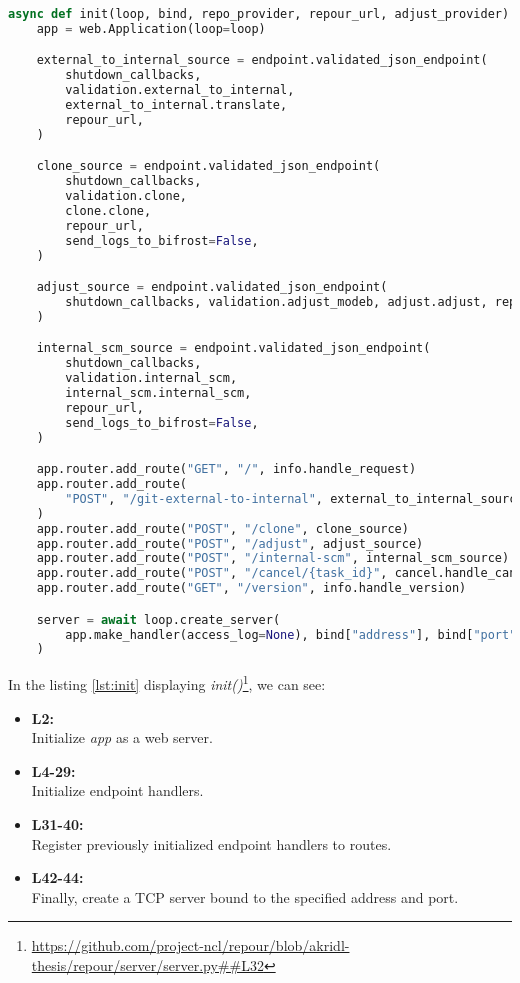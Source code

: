 \documentclass[../main.tex]{subfiles}
\begin{document}
\begin{lstlisting}[language=Python, caption=Server intialization: \textit{init} method, label={lst:init}]
async def init(loop, bind, repo_provider, repour_url, adjust_provider):
    app = web.Application(loop=loop)

    external_to_internal_source = endpoint.validated_json_endpoint(
        shutdown_callbacks,
        validation.external_to_internal,
        external_to_internal.translate,
        repour_url,
    )

    clone_source = endpoint.validated_json_endpoint(
        shutdown_callbacks,
        validation.clone,
        clone.clone,
        repour_url,
        send_logs_to_bifrost=False,
    )

    adjust_source = endpoint.validated_json_endpoint(
        shutdown_callbacks, validation.adjust_modeb, adjust.adjust, repour_url
    )

    internal_scm_source = endpoint.validated_json_endpoint(
        shutdown_callbacks,
        validation.internal_scm,
        internal_scm.internal_scm,
        repour_url,
        send_logs_to_bifrost=False,
    )

    app.router.add_route("GET", "/", info.handle_request)
    app.router.add_route(
        "POST", "/git-external-to-internal", external_to_internal_source
    )
    app.router.add_route("POST", "/clone", clone_source)
    app.router.add_route("POST", "/adjust", adjust_source)
    app.router.add_route("POST", "/internal-scm", internal_scm_source)
    app.router.add_route("POST", "/cancel/{task_id}", cancel.handle_cancel)
    app.router.add_route("GET", "/version", info.handle_version)

    server = await loop.create_server(
        app.make_handler(access_log=None), bind["address"], bind["port"]
    )
\end{lstlisting}

In the listing \ref{lst:init} displaying \textit{init()}\footnote{\url{https://github.com/project-ncl/repour/blob/akridl-thesis/repour/server/server.py##L32}}, we can see:
\begin{itemize}
    \item \textbf{L2:}\\
    Initialize \textit{app} as a web server.

    \item \textbf{L4-29:}\\
    Initialize endpoint handlers.

    \item \textbf{L31-40:}\\
    Register previously initialized endpoint handlers to routes.

    \item \textbf{L42-44:}\\
    Finally, create a TCP server bound to the specified address and port.

\end{itemize}
\end{document}

